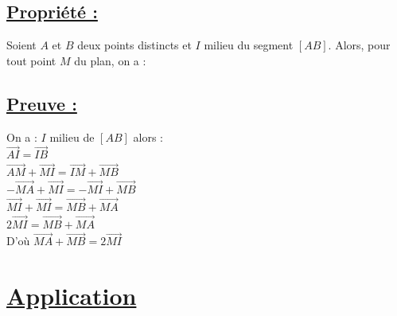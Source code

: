 \documentclass{article}
\begin{document}
\subsection*{\underline{Propriété :}}
Soient $A$ et $B$ deux points distincts et $I$ milieu du segment $[AB]$. Alors, pour tout point $M$ du plan, on a :

\begin{center}
    \color{red}
    \quad \quad
\end{center}

\vspace{1em}

\subsection*{\underline{Preuve :}}

\begin{center}
\end{center}

\noindent On a : $I$ milieu de $[AB]$ alors : \\
$\overrightarrow{AI} = \overrightarrow{IB}$ \\
$\overrightarrow{AM} + \overrightarrow{MI} = \overrightarrow{IM} + \overrightarrow{MB}$ \\
$-\overrightarrow{MA} + \overrightarrow{MI} = -\overrightarrow{MI} + \overrightarrow{MB}$ \\
$\overrightarrow{MI} + \overrightarrow{MI} = \overrightarrow{MB} + \overrightarrow{MA}$ \\
$2\overrightarrow{MI} = \overrightarrow{MB} + \overrightarrow{MA}$ \\
D'où $\overrightarrow{MA} + \overrightarrow{MB} = 2\overrightarrow{MI}$

\section*{\underline{\color{red}Application}}
\end{document}

